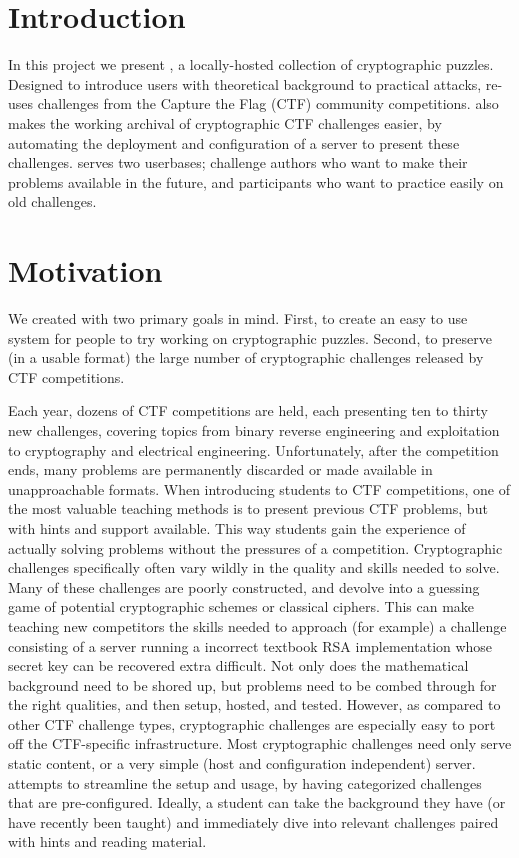 \section{Introduction}
In this project we present \cvm{}, a locally-hosted collection of
cryptographic puzzles. Designed to introduce users with theoretical
background to practical attacks, \cvm{} re-uses challenges from the
Capture the Flag (CTF)\cite{ctftime:whatisctf} community
competitions. \cvm{} also makes the working archival of cryptographic
CTF challenges easier, by automating the deployment and configuration
of a server to present these challenges. \cvm{} serves two userbases;
challenge authors who want to make their problems available in the
future, and participants who want to practice easily on old
challenges.


\section{Motivation}
We created \cvm{} with two primary goals in mind. First, to create an
easy to use system for people to try working on cryptographic
puzzles. Second, to preserve (in a usable format) the large number of
cryptographic challenges released by CTF competitions.

Each year, dozens of CTF competitions are held, each presenting ten to
thirty new challenges, covering topics from binary reverse engineering
and exploitation to cryptography and electrical
engineering. Unfortunately, after the competition ends, many problems
are permanently discarded or made available in unapproachable
formats. When introducing students to CTF competitions, one of the
most valuable teaching methods is to present previous CTF problems,
but with hints and support available. This way students gain the
experience of actually solving problems without the pressures of a
competition. Cryptographic challenges specifically often vary wildly
in the quality and skills needed to solve. Many of these challenges
are poorly constructed, and devolve into a guessing game of potential
cryptographic schemes or classical ciphers. This can make teaching new
competitors the skills needed to approach (for example) a challenge
consisting of a server running a incorrect textbook RSA implementation
whose secret key can be recovered extra difficult. Not only does the
mathematical background need to be shored up, but problems need to be
combed through for the right qualities, and then setup, hosted, and
tested. However, as compared to other CTF challenge types,
cryptographic challenges are especially easy to port off the
CTF-specific infrastructure. Most cryptographic challenges need only
serve static content, or a very simple (host and configuration
independent) server. \cvm{} attempts to streamline the setup and
usage, by having categorized challenges that are
pre-configured. Ideally, a student can take the background they have
(or have recently been taught) and immediately dive into relevant
challenges paired with hints and reading material.

